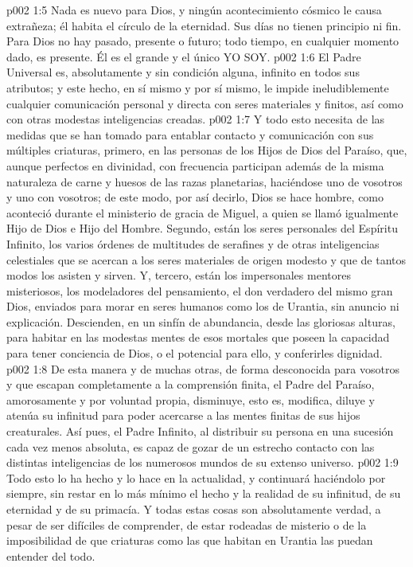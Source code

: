 \vs p002 1:5 Nada es nuevo para Dios, y ningún acontecimiento cósmico le causa extrañeza; él habita el círculo de la eternidad. Sus días no tienen principio ni fin. Para Dios no hay pasado, presente o futuro; todo tiempo, en cualquier momento dado, es presente. Él es el grande y el único YO SOY.
\vs p002 1:6 \pc El Padre Universal es, absolutamente y sin condición alguna, infinito en todos sus atributos; y este hecho, en sí mismo y por sí mismo, le impide ineludiblemente cualquier comunicación personal y directa con seres materiales y finitos, así como con otras modestas inteligencias creadas.
\vs p002 1:7 Y todo esto necesita de las medidas que se han tomado para entablar contacto y comunicación con sus múltiples criaturas, primero, en las personas de los Hijos de Dios del Paraíso, que, aunque perfectos en divinidad, con frecuencia participan además de la misma naturaleza de carne y huesos de las razas planetarias, haciéndose uno de vosotros y uno con vosotros; de este modo, por así decirlo, Dios se hace hombre, como aconteció durante el ministerio de gracia de Miguel, a quien se llamó igualmente Hijo de Dios e Hijo del Hombre. Segundo, están los seres personales del Espíritu Infinito, los varios órdenes de multitudes de serafines y de otras inteligencias celestiales que se acercan a los seres materiales de origen modesto y que de tantos modos los asisten y sirven. Y, tercero, están los impersonales mentores misteriosos, los modeladores del pensamiento, el don verdadero del mismo gran Dios, enviados para morar en seres humanos como los de Urantia, sin anuncio ni explicación. Descienden, en un sinfín de abundancia, desde las gloriosas alturas, para habitar en las modestas mentes de esos mortales que poseen la capacidad para tener conciencia de Dios, o el potencial para ello, y conferirles dignidad.
\vs p002 1:8 De esta manera y de muchas otras, de forma desconocida para vosotros y que escapan completamente a la comprensión finita, el Padre del Paraíso, amorosamente y por voluntad propia, disminuye, esto es, modifica, diluye y atenúa su infinitud para poder acercarse a las mentes finitas de sus hijos creaturales. Así pues, el Padre Infinito, al distribuir su persona en una sucesión cada vez menos absoluta, es capaz de gozar de un estrecho contacto con las distintas inteligencias de los numerosos mundos de su extenso universo.
\vs p002 1:9 Todo esto lo ha hecho y lo hace en la actualidad, y continuará haciéndolo por siempre, sin restar en lo más mínimo el hecho y la realidad de su infinitud, de su eternidad y de su primacía. Y todas estas cosas son absolutamente verdad, a pesar de ser difíciles de comprender, de estar rodeadas de misterio o de la imposibilidad de que criaturas como las que habitan en Urantia las puedan entender del todo.
